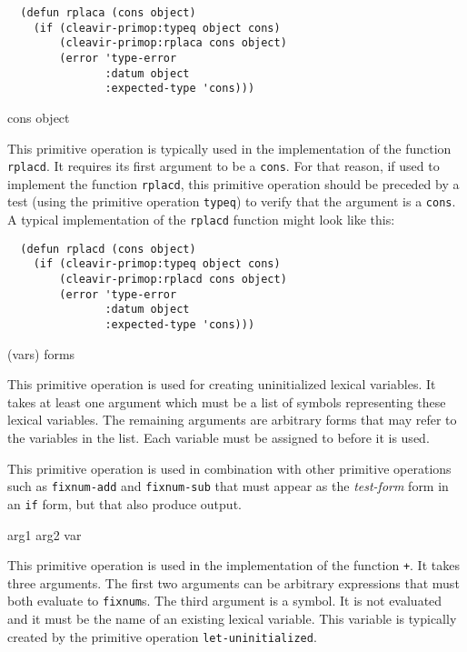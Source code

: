 \begin{verbatim}
  (defun rplaca (cons object)
    (if (cleavir-primop:typeq object cons)
        (cleavir-primop:rplaca cons object)
        (error 'type-error
               :datum object
               :expected-type 'cons)))
\end{verbatim}

 {cons object}

This primitive operation is typically used in the implementation of
the \commonlisp{} function \texttt{rplacd}.  It requires its first
argument to be a \texttt{cons}.  For that reason, if used to implement
the \commonlisp{} function \texttt{rplacd}, this primitive operation
should be preceded by a test (using the primitive operation
\texttt{typeq}) to verify that the argument is a \texttt{cons}.  A
typical implementation of the \texttt{rplacd} function might look like
this:

\begin{verbatim}
  (defun rplacd (cons object)
    (if (cleavir-primop:typeq object cons)
        (cleavir-primop:rplacd cons object)
        (error 'type-error
               :datum object
               :expected-type 'cons)))
\end{verbatim}

 {(\rest vars) \body forms}

This primitive operation is used for creating uninitialized lexical
variables.  It takes at least one argument which must be a list of
symbols representing these lexical variables.  The remaining arguments
are arbitrary forms that may refer to the variables in the list.  Each
variable must be assigned to before it is used.

This primitive operation is used in combination with other primitive
operations such as \texttt{fixnum-add} and \texttt{fixnum-sub} that
must appear as the \emph{test-form} form in an \texttt{if} form, but
that also produce output.

 {arg1 arg2 var}

This primitive operation is used in the implementation of the
\commonlisp{} function \texttt{+}.  It takes three arguments.  The
first two arguments can be arbitrary expressions that must both
evaluate to \texttt{fixnum}s.   The third argument is a symbol.  It is
not evaluated and it must be the name of an existing lexical
variable.  This variable is typically created by the primitive
operation \texttt{let-uninitialized}.

